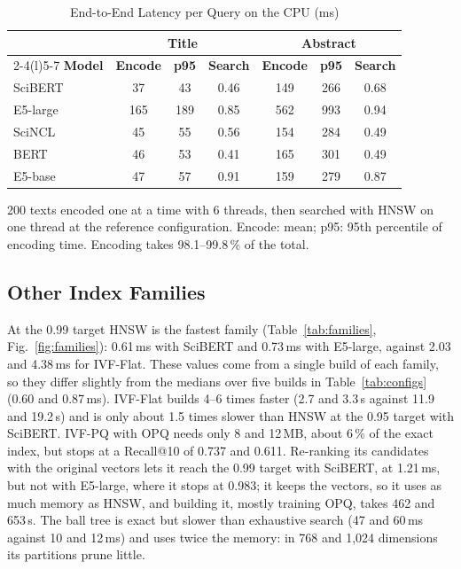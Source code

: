 \documentclass[conference, letterpaper]{IEEEtran}
\begin{document}
\begin{table}[!tb]
\centering
\begin{threeparttable}
\caption{End-to-End Latency per Query on the CPU (ms)}
\label{tab:e2e}
\footnotesize
\setlength{\tabcolsep}{4pt}
\begin{tabular}{@{}l ccc ccc@{}}
\toprule
 & \multicolumn{3}{c}{\textbf{Title}} & \multicolumn{3}{c}{\textbf{Abstract}} \\
\cmidrule(lr){2-4}\cmidrule(l){5-7}
\textbf{Model} & \textbf{Encode} & \textbf{p95} & \textbf{Search} & \textbf{Encode} & \textbf{p95} & \textbf{Search} \\
\midrule
SciBERT  & 37  & 43  & 0.46 & 149 & 266 & 0.68 \\
E5-large & 165 & 189 & 0.85 & 562 & 993 & 0.94 \\
SciNCL   & 45  & 55  & 0.56 & 154 & 284 & 0.49 \\
BERT     & 46  & 53  & 0.41 & 165 & 301 & 0.49 \\
E5-base  & 47  & 57  & 0.91 & 159 & 279 & 0.87 \\
\bottomrule
\end{tabular}
\begin{tablenotes}
\scriptsize
\item 200 texts encoded one at a time with 6 threads, then searched with HNSW on one thread at the reference configuration. Encode: mean; p95: 95th percentile of encoding time. Encoding takes 98.1--99.8\,\% of the total.
\end{tablenotes}
\end{threeparttable}
\end{table}

\subsection{Other Index Families}

At the 0.99 target HNSW is the fastest family (Table~\ref{tab:families}, Fig.~\ref{fig:families}): 0.61\,ms with SciBERT and 0.73\,ms with E5-large, against 2.03 and 4.38\,ms for IVF-Flat. These values come from a single build of each family, so they differ slightly from the medians over five builds in Table~\ref{tab:configs} (0.60 and 0.87\,ms). IVF-Flat builds 4--6 times faster (2.7 and 3.3\,s against 11.9 and 19.2\,s) and is only about 1.5 times slower than HNSW at the 0.95 target with SciBERT. IVF-PQ with OPQ needs only 8 and 12\,MB, about 6\,\% of the exact index, but stops at a Recall@10 of 0.737 and 0.611. Re-ranking its candidates with the original vectors lets it reach the 0.99 target with SciBERT, at 1.21\,ms, but not with E5-large, where it stops at 0.983; it keeps the vectors, so it uses as much memory as HNSW, and building it, mostly training OPQ, takes 462 and 653\,s. The ball tree is exact but slower than exhaustive search (47 and 60\,ms against 10 and 12\,ms) and uses twice the memory: in 768 and 1,024 dimensions its partitions prune little.
\end{document}
